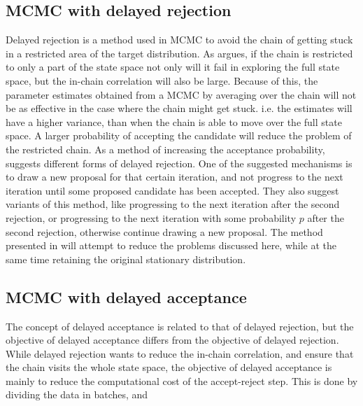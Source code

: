 \subsection{MCMC with delayed rejection}
Delayed rejection is a method used in MCMC to avoid the chain of getting stuck in a restricted area of the target distribution. As \cite{mira2001metropolis} argues, if the chain is restricted to only a part of the state space not only will it fail in exploring the full state space, but the in-chain correlation will also be large. 
Because of this, the parameter estimates obtained from a MCMC by averaging over the chain will not be as effective in the case where the chain might get stuck.  i.e. the estimates will have a higher variance, than when the chain is able to move over the full state space.
A larger probability of accepting the candidate will reduce the problem of the restricted chain. 
As a method of increasing the acceptance probability, \cite{mira2001metropolis} suggests different forms of delayed rejection. One of the suggested mechanisms is to draw a new proposal for that certain iteration, and not progress to the next iteration until some proposed candidate has been accepted. 
They also suggest variants of this method, like progressing to the next iteration after the second rejection, or progressing to the next iteration with some probability $p$ after the second rejection, otherwise continue drawing a new proposal. 
The method presented in \cite{mira2001metropolis} will attempt to reduce the problems discussed here, while at the same time retaining the original stationary distribution.

\subsection{MCMC with delayed acceptance}
The concept of delayed acceptance is related to that of delayed rejection, but the objective of delayed acceptance differs from the objective of delayed rejection. While delayed rejection wants to reduce the in-chain correlation, and ensure that the chain visits the whole state space, the objective of delayed acceptance is mainly to reduce the computational cost of the accept-reject step.  
This is done by dividing the data in batches, and  
